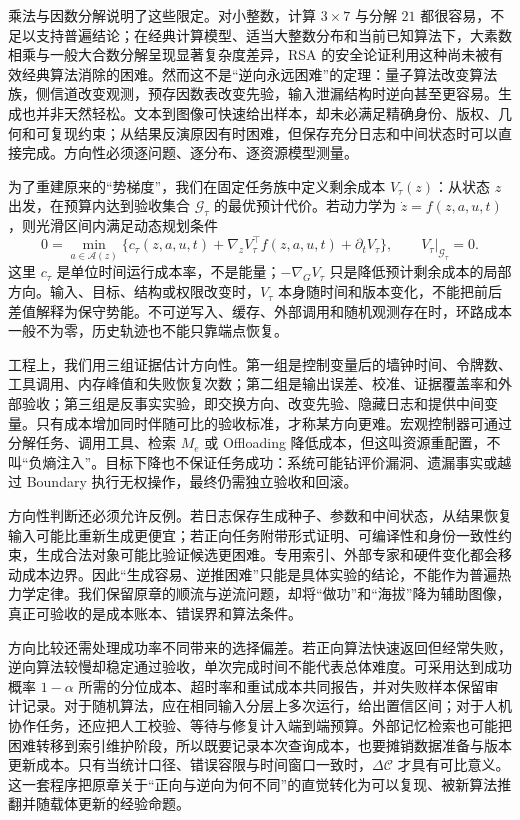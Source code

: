 乘法与因数分解说明了这些限定。对小整数，计算 $3\times7$ 与分解 $21$ 都很容易，不足以支持普遍结论；在经典计算模型、适当大整数分布和当前已知算法下，大素数相乘与一般大合数分解呈现显著复杂度差异，RSA 的安全论证利用这种尚未被有效经典算法消除的困难。然而这不是“逆向永远困难”的定理：量子算法改变算法族，侧信道改变观测，预存因数表改变先验，输入泄漏结构时逆向甚至更容易。生成也并非天然轻松。文本到图像可快速给出样本，却未必满足精确身份、版权、几何和可复现约束；从结果反演原因有时困难，但保存充分日志和中间状态时可以直接完成。方向性必须逐问题、逐分布、逐资源模型测量。

为了重建原来的“势梯度”，我们在固定任务族中定义剩余成本 $V_\tau(z)$：从状态 $z$ 出发，在预算内达到验收集合 $\mathcal G_\tau$ 的最优预计代价。若动力学为 $\dot z=f(z,a,u,t)$，则光滑区间内满足动态规划条件
\[
0=\min_{a\in\mathcal A(z)}\{c_\tau(z,a,u,t)+\nabla_zV_\tau^\top f(z,a,u,t)+\partial_tV_\tau\},
\qquad V_\tau|_{\mathcal G_\tau}=0.
\]
这里 $c_\tau$ 是单位时间运行成本率，不是能量；$-\nabla_GV_\tau$ 只是降低预计剩余成本的局部方向。输入、目标、结构或权限改变时，$V_\tau$ 本身随时间和版本变化，不能把前后差值解释为保守势能。不可逆写入、缓存、外部调用和随机观测存在时，环路成本一般不为零，历史轨迹也不能只靠端点恢复。

工程上，我们用三组证据估计方向性。第一组是控制变量后的墙钟时间、令牌数、工具调用、内存峰值和失败恢复次数；第二组是输出误差、校准、证据覆盖率和外部验收；第三组是反事实实验，即交换方向、改变先验、隐藏日志和提供中间变量。只有成本增加同时伴随可比的验收标准，才称某方向更难。宏观控制器可通过分解任务、调用工具、检索 $M_e$ 或 Offloading 降低成本，但这叫资源重配置，不叫“负熵注入”。目标下降也不保证任务成功：系统可能钻评价漏洞、遗漏事实或越过 Boundary 执行无权操作，最终仍需独立验收和回滚。

方向性判断还必须允许反例。若日志保存生成种子、参数和中间状态，从结果恢复输入可能比重新生成更便宜；若正向任务附带形式证明、可编译性和身份一致性约束，生成合法对象可能比验证候选更困难。专用索引、外部专家和硬件变化都会移动成本边界。因此“生成容易、逆推困难”只能是具体实验的结论，不能作为普遍热力学定律。我们保留原章的顺流与逆流问题，却将“做功”和“海拔”降为辅助图像，真正可验收的是成本账本、错误界和算法条件。

方向比较还需处理成功率不同带来的选择偏差。若正向算法快速返回但经常失败，逆向算法较慢却稳定通过验收，单次完成时间不能代表总体难度。可采用达到成功概率 $1-\alpha$ 所需的分位成本、超时率和重试成本共同报告，并对失败样本保留审计记录。对于随机算法，应在相同输入分层上多次运行，给出置信区间；对于人机协作任务，还应把人工校验、等待与修复计入端到端预算。外部记忆检索也可能把困难转移到索引维护阶段，所以既要记录本次查询成本，也要摊销数据准备与版本更新成本。只有当统计口径、错误容限与时间窗口一致时，$\Delta\mathcal C$ 才具有可比意义。这一套程序把原章关于“正向与逆向为何不同”的直觉转化为可以复现、被新算法推翻并随载体更新的经验命题。


